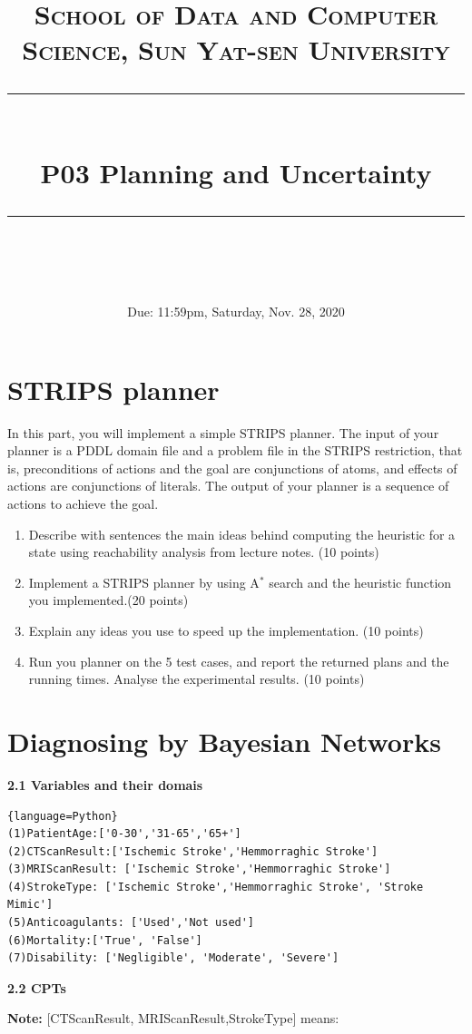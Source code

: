 \documentclass[a4paper, 11pt]{article}
\title{	
\normalfont \normalsize
\textsc{School of Data and Computer Science, Sun Yat-sen University} \\ [25pt] %
\rule{\textwidth}{0.5pt} \\[0.4cm] %
\huge  P03 Planning and Uncertainty\\ %
\rule{\textwidth}{2pt} \\[0.5cm] %
\author{}
\date{Due: 11:59pm, Saturday, Nov. 28, 2020}
}
\begin{document}
\maketitle
\tableofcontents
\newpage
\section{STRIPS planner}
In this part, you will implement a simple STRIPS planner. The input of your planner is a PDDL domain file and a problem file in the STRIPS restriction, that is, preconditions of actions and the goal are conjunctions of atoms, and effects of actions are conjunctions of literals. The output of your planner is a sequence of actions to achieve the goal.

\begin{enumerate}

\item Describe with sentences the main ideas behind computing the heuristic for a state using reachability analysis from lecture notes. (10 points)
    

\item Implement a STRIPS planner by using A$^*$ search and the heuristic function you implemented.(20 points)

\item Explain any ideas you use to speed up the implementation. (10 points)

\item Run you planner on the 5 test cases, and report the returned plans and the running times. Analyse the experimental results. (10 points)

\end{enumerate}


\section{Diagnosing by Bayesian Networks}
\textbf{2.1 Variables and their domais}
\begin{lstlisting}{language=Python}
(1)PatientAge:['0-30','31-65','65+']
(2)CTScanResult:['Ischemic Stroke','Hemmorraghic Stroke']
(3)MRIScanResult: ['Ischemic Stroke','Hemmorraghic Stroke']
(4)StrokeType: ['Ischemic Stroke','Hemmorraghic Stroke', 'Stroke Mimic']
(5)Anticoagulants: ['Used','Not used']
(6)Mortality:['True', 'False']
(7)Disability: ['Negligible', 'Moderate', 'Severe']
\end{lstlisting}
\textbf{2.2 CPTs}

\textbf{Note:} [CTScanResult, MRIScanResult,StrokeType] means:
\end{document}
